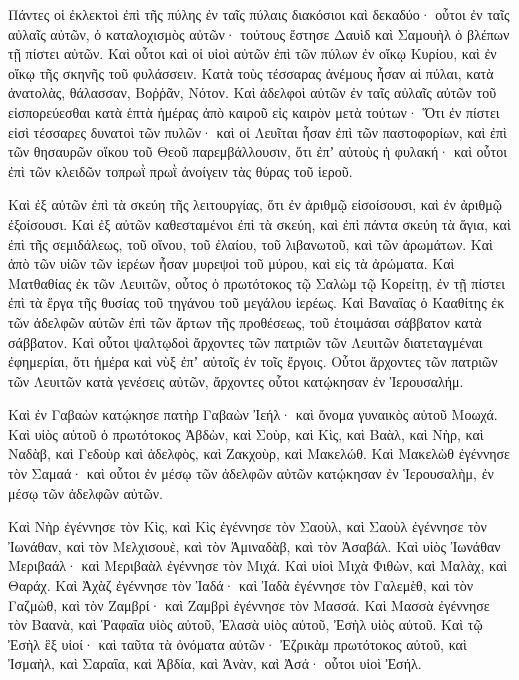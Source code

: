 {Πάντες οἱ ἐκλεκτοὶ ἐπὶ τῆς πύλης ἐν ταῖς πύλαις διακόσιοι καὶ δεκαδύο· οὗτοι ἐν ταῖς αὐλαῖς αὐτῶν, ὁ καταλοχισμὸς αὐτῶν· τούτους ἔστησε Δαυὶδ καὶ Σαμουὴλ ὁ βλέπων τῇ πίστει αὐτῶν.
Καὶ οὗτοι καὶ οἱ υἱοὶ αὐτῶν ἐπὶ τῶν πύλων ἐν οἴκῳ Κυρίου, καὶ ἐν οἴκῳ τῆς σκηνῆς τοῦ φυλάσσειν.
Κατὰ τοὺς τέσσαρας ἀνέμους ἦσαν αἱ πύλαι, κατὰ ἀνατολὰς, θάλασσαν, Βοῤῥᾶν, Νότον.
Καὶ ἀδελφοὶ αὐτῶν ἐν ταῖς αὐλαῖς αὐτῶν τοῦ εἰσπορεύεσθαι κατὰ ἑπτὰ ἡμέρας ἀπὸ καιροῦ εἰς καιρὸν μετὰ τούτων·
Ὅτι ἐν πίστει εἰσὶ τέσσαρες δυνατοὶ τῶν πυλῶν· καὶ οἱ Λευῖται ἦσαν ἐπὶ τῶν παστοφορίων, καὶ ἐπὶ τῶν θησαυρῶν οἴκου τοῦ Θεοῦ παρεμβάλλουσιν,
ὅτι ἐπʼ αὐτοὺς ἡ φυλακή· καὶ οὗτοι ἐπὶ τῶν κλειδῶν τοπρωῒ πρωῒ ἀνοίγειν τὰς θύρας τοῦ ἱεροῦ.
\par }{\PP {}Καὶ ἐξ αὐτῶν ἐπὶ τὰ σκεύη τῆς λειτουργίας, ὅτι ἐν ἀριθμῷ εἰσοίσουσι, καὶ ἐν ἀριθμῷ ἐξοίσουσι.
Καὶ ἐξ αὐτῶν καθεσταμένοι ἐπὶ τὰ σκεύη, καὶ ἐπὶ πάντα σκεύη τὰ ἅγια, καὶ ἐπὶ τῆς σεμιδάλεως, τοῦ οἴνου, τοῦ ἐλαίου, τοῦ λιβανωτοῦ, καὶ τῶν ἀρωμάτων.
Καὶ ἀπὸ τῶν υἱῶν τῶν ἱερέων ἦσαν μυρεψοὶ τοῦ μύρου, καὶ εἰς τὰ ἀρώματα.
Καὶ Ματθαθίας ἐκ τῶν Λευιτῶν, οὗτος ὁ πρωτότοκος τῷ Σαλὼμ τῷ Κορείτῃ, ἐν τῇ πίστει ἐπὶ τὰ ἔργα τῆς θυσίας τοῦ τηγάνου τοῦ μεγάλου ἱερέως.
Καὶ Βαναΐας ὁ Κααθίτης ἐκ τῶν ἀδελφῶν αὐτῶν ἐπὶ τῶν ἄρτων τῆς προθέσεως, τοῦ ἑτοιμάσαι σάββατον κατὰ σάββατον.
Καὶ οὗτοι ψαλτῳδοὶ ἄρχοντες τῶν πατριῶν τῶν Λευιτῶν διατεταγμέναι ἐφημερίαι, ὅτι ἡμέρα καὶ νὺξ ἐπʼ αὐτοῖς ἐν τοῖς ἔργοις.
Οὗτοι ἄρχοντες τῶν πατριῶν τῶν Λευιτῶν κατὰ γενέσεις αὐτῶν, ἄρχοντες οὗτοι κατῴκησαν ἐν Ἱερουσαλήμ.
\par }{\PP {}Καὶ ἐν Γαβαὼν κατῴκησε πατὴρ Γαβαὼν Ἰεήλ· καὶ ὄνομα γυναικὸς αὐτοῦ Μοωχά.
Καὶ υἱὸς αὐτοῦ ὁ πρωτότοκος Ἀβδὼν, καὶ Σοὺρ, καὶ Κὶς, καὶ Βαὰλ, καὶ Νὴρ, καὶ Ναδὰβ,
καὶ Γεδοὺρ καὶ ἀδελφὸς, καὶ Ζακχοὺρ, καὶ Μακελώθ.
Καὶ Μακελὼθ ἐγέννησε τὸν Σαμαά· καὶ οὗτοι ἐν μέσῳ τῶν ἀδελφῶν αὐτῶν κατῴκησαν ἐν Ἱερουσαλὴμ, ἐν μέσῳ τῶν ἀδελφῶν αὐτῶν.
\par }{\PP {}Καὶ Νὴρ ἐγέννησε τὸν Κὶς, καὶ Κὶς ἐγέννησε τὸν Σαοὺλ, καὶ Σαοὺλ ἐγέννησε τὸν Ἰωνάθαν, καὶ τὸν Μελχισουὲ, καὶ τὸν Ἀμιναδὰβ, καὶ τὸν Ἀσαβάλ.
Καὶ υἱὸς Ἰωνάθαν Μεριβαάλ· καὶ Μεριβαὰλ ἐγέννησε τὸν Μιχά.
Καὶ υἱοὶ Μιχὰ Φιθὼν, καὶ Μαλὰχ, καὶ Θαράχ.
Καὶ Ἀχὰζ ἐγέννησε τὸν Ἰαδά· καὶ Ἰαδὰ ἐγέννησε τὸν Γαλεμὲθ, καὶ τὸν Γαζμὼθ, καὶ τὸν Ζαμβρί· καὶ Ζαμβρὶ ἐγέννησε τὸν Μασσά.
Καὶ Μασσὰ ἐγέννησε τὸν Βαανὰ, καὶ Ῥαφαΐα υἱὸς αὐτοῦ, Ἐλασὰ υἱὸς αὐτοῦ, Ἐσὴλ υἱὸς αὐτοῦ.
Καὶ τῷ Ἐσὴλ ἓξ υἱοί· καὶ ταῦτα τὰ ὀνόματα αὐτῶν· Ἐζρικὰμ πρωτότοκος αὐτοῦ, καὶ Ἰσμαὴλ, καὶ Σαραΐα, καὶ Ἀβδία, καὶ Ἀνὰν, καὶ Ἀσά· οὗτοι υἱοὶ Ἐσήλ.

}
